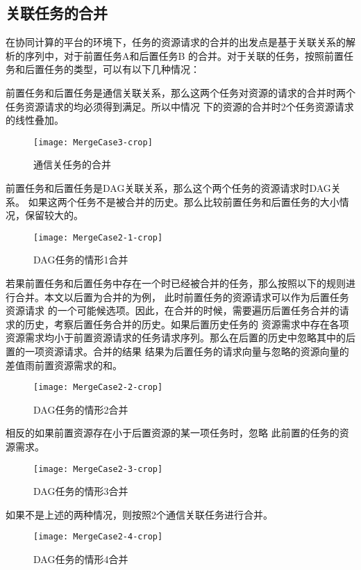 \subsection{关联任务的合并}
在协同计算的平台的环境下，任务的资源请求的合并的出发点是基于关联关系的解析的序列中，对于前置任务A和后置任务B
的合并。对于关联的任务，按照前置任务和后置任务的类型，可以有以下几种情况：

前置任务和后置任务是通信关联关系，那么这两个任务对资源的请求的合并时两个任务资源请求的均必须得到满足。所以中情况
下的资源的合并时2个任务资源请求的线性叠加。
\begin{figure}[htbp]
\centering\texttt{[image: MergeCase3-crop]}
\caption{通信关任务的合并}\label{fig:MergeCase3}
\end{figure}

前置任务和后置任务是DAG关联关系，那么这个两个任务的资源请求时DAG关系。
如果这两个任务不是被合并的历史。那么比较前置任务和后置任务的大小情况，保留较大的。
\begin{figure}[htbp]
\centering\texttt{[image: MergeCase2-1-crop]}
\caption{DAG任务的情形1合并}\label{fig:MergeCase2-1}
\end{figure}

若果前置任务和后置任务中存在一个时已经被合并的任务，那么按照以下的规则进行合并。本文以后置为合并的为例，
此时前置任务的资源请求可以作为后置任务资源请求
的一个可能候选项。因此，在合并的时候，需要遍历后置任务合并的请求的历史，考察后置任务合并的历史。如果后置历史任务的
资源需求中存在各项资源需求均小于前置资源请求的任务请求序列。那么在后置的历史中忽略其中的后置的一项资源请求。合并的结果
结果为后置任务的请求向量与忽略的资源向量的差值雨前置资源需求的和。
\begin{figure}[htbp]
\centering\texttt{[image: MergeCase2-2-crop]}
\caption{DAG任务的情形2合并}\label{fig:MergeCase2-2}
\end{figure}

相反的如果前置资源存在小于后置资源的某一项任务时，忽略
此前置的任务的资源需求。
\begin{figure}[htbp]
\centering\texttt{[image: MergeCase2-3-crop]}
\caption{DAG任务的情形3合并}\label{fig:MergeCase2-3}
\end{figure}

如果不是上述的两种情况，则按照2个通信关联任务进行合并。
\begin{figure}[htbp]
\centering\texttt{[image: MergeCase2-4-crop]}
\caption{DAG任务的情形4合并}\label{fig:MergeCase2-4}
\end{figure}

